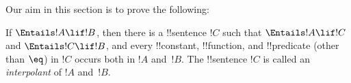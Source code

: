 \documentclass[../../include/open-logic-section]{subfiles}
\begin{document}


Our aim in this section is to prove the following:

\begin{thm}
If $\Entails !A \lif !B$, then there is a !!{sentence} $!C$ such that
$\Entails !A \lif !C$ and $\Entails !C \lif !B$, and every
!!{constant}, !!{function}, and !!{predicate} (other than $\eq$) in
$!C$ occurs both in $!A$ and~$!B$. The !!{sentence} $!C$ is called an
\emph{interpolant} of $!A$ and~$!B$.
\end{thm}
\end{document}
